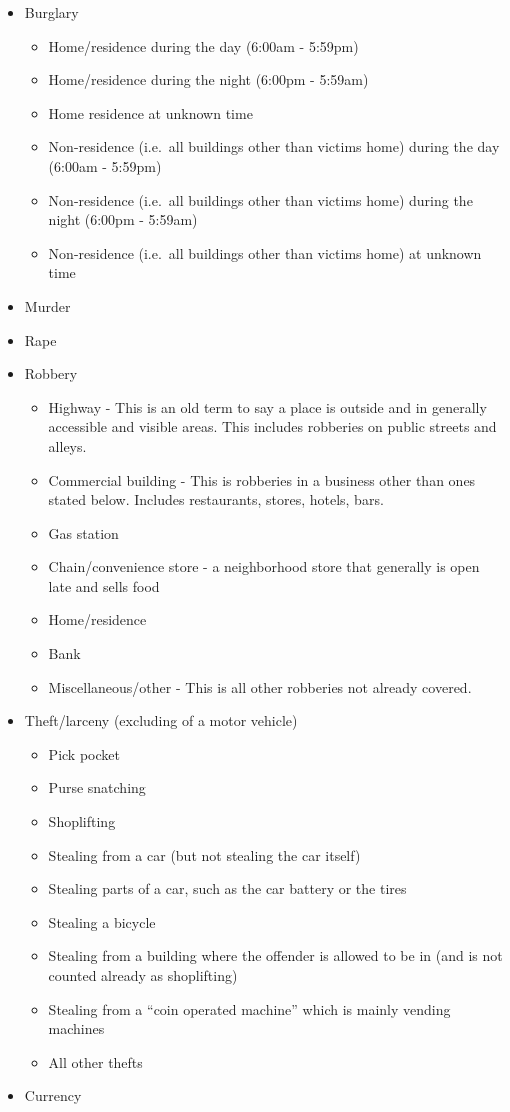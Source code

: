 \documentclass[
  12pt,
  openany]{book}
\providecommand{\tightlist}{%
  \setlength{\itemsep}{0pt}\setlength{\parskip}{0pt}}
\begin{document}
\begin{itemize}
\tightlist
\item
  Burglary

  \begin{itemize}
  \tightlist
  \item
    Home/residence during the day (6:00am - 5:59pm)
  \item
    Home/residence during the night (6:00pm - 5:59am)
  \item
    Home residence at unknown time
  \item
    Non-residence (i.e.~all buildings other than victims home) during the day (6:00am - 5:59pm)
  \item
    Non-residence (i.e.~all buildings other than victims home) during the night (6:00pm - 5:59am)
  \item
    Non-residence (i.e.~all buildings other than victims home) at unknown time
  \end{itemize}
\item
  Murder
\item
  Rape
\item
  Robbery

  \begin{itemize}
  \tightlist
  \item
    Highway - This is an old term to say a place is outside and in generally accessible and visible areas. This includes robberies on public streets and alleys.
  \item
    Commercial building - This is robberies in a business other than ones stated below. Includes restaurants, stores, hotels, bars.
  \item
    Gas station
  \item
    Chain/convenience store - a neighborhood store that generally is open late and sells food
  \item
    Home/residence
  \item
    Bank
  \item
    Miscellaneous/other - This is all other robberies not already covered.
  \end{itemize}
\item
  Theft/larceny (excluding of a motor vehicle)

  \begin{itemize}
  \tightlist
  \item
    Pick pocket
  \item
    Purse snatching
  \item
    Shoplifting
  \item
    Stealing from a car (but not stealing the car itself)
  \item
    Stealing parts of a car, such as the car battery or the tires
  \item
    Stealing a bicycle
  \item
    Stealing from a building where the offender is allowed to be in (and is not counted already as shoplifting)
  \item
    Stealing from a ``coin operated machine'' which is mainly vending machines
  \item
    All other thefts
  \end{itemize}
\item
  Currency


\end{itemize}
\end{document}
